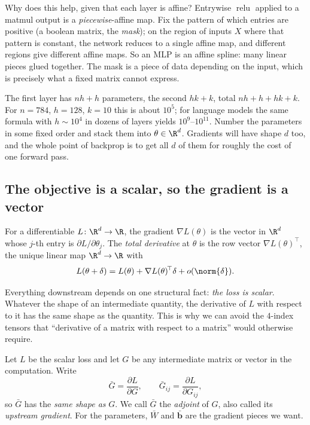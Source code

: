 Why does this help, given that each layer is affine? Entrywise $\operatorname{relu}$
applied to a matmul output is a \emph{piecewise}-affine map. Fix the pattern of
which entries are positive (a boolean matrix, the \emph{mask}); on the region
of inputs $X$ where that pattern is constant, the network reduces to a single
affine map, and different regions give different affine maps. So an MLP is an
affine spline: many linear pieces glued together. The mask is a piece of data
depending on the input, which is precisely what a fixed matrix cannot express.

\begin{remark}
The first layer has $nh+h$ parameters, the second $hk+k$, total
$nh+h+hk+k$. For $n=784$, $h=128$, $k=10$ this is about $10^5$; for language
models the same formula with $h\sim10^{4}$ in dozens of layers yields
$10^{9}$--$10^{11}$. Number the parameters in some fixed order and stack them
into $\theta\in\R^{d}$. Gradients will have shape $d$ too, and the whole point
of backprop is to get all $d$ of them for roughly the cost of one forward pass.
\end{remark}

\subsection{The objective is a scalar, so the gradient is a vector}

\begin{definition}[Gradient]
For a differentiable $L\colon\R^{d}\to\R$, the gradient $\nabla L(\theta)$ is
the vector in $\R^{d}$ whose $j$-th entry is
$\partial L/\partial\theta_j$. The \emph{total derivative} at $\theta$ is the
row vector $\nabla L(\theta)^{\!\top}$, the unique linear map
$\R^{d}\to\R$ with
\[
  L(\theta+\delta)=L(\theta)+\nabla L(\theta)^{\!\top}\delta+o(\norm{\delta}).
\]
\end{definition}

Everything downstream depends on one structural fact: \emph{the loss is
scalar}. Whatever the shape of an intermediate quantity, the derivative of
$L$ with respect to it has the same shape as the quantity. This is why we can
avoid the $4$-index tensors that ``derivative of a matrix with respect to a
matrix'' would otherwise require.

\begin{definition}[Adjoint]
Let $L$ be the scalar loss and let $G$ be any intermediate matrix or vector in
the computation. Write
\[
  \bar{G}=\frac{\partial L}{\partial G},\qquad \bar{G}_{ij}=\frac{\partial L}{\partial G_{ij}},
\]
so $\bar{G}$ has the \emph{same shape as} $G$. We call $\bar{G}$ the
\emph{adjoint} of $G$, also called its \emph{upstream gradient}. For the
parameters, $\bar{W}$ and $\bar{\mathbf b}$ are the gradient pieces we want.
\end{definition}

